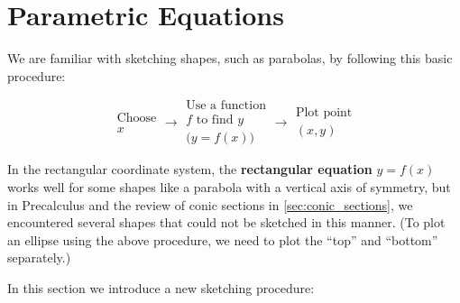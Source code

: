 \section{Parametric Equations}\label{sec:param_eqs}

We are familiar with sketching  shapes, such as parabolas, by following this basic procedure:

\[
\begin{gathered}\text{Choose}\\x\end{gathered}
\longrightarrow
\begin{gathered}
\text{Use a function}\\f\text{ to find }y\\\bigl(y=f(x)\bigr)
\end{gathered}
\longrightarrow
\begin{gathered}\text{Plot point}\\(x,y)\end{gathered}
\]

In the rectangular coordinate system, the \textbf{rectangular equation} $y=f(x)$ works well for some shapes like a parabola with a vertical axis of symmetry, but in Precalculus and the review of conic sections in \autoref{sec:conic_sections}, we encountered several shapes that could not be sketched in this manner. (To plot an ellipse using the above procedure, we need to plot the ``top'' and ``bottom'' separately.)

In this section we introduce a new sketching procedure:

